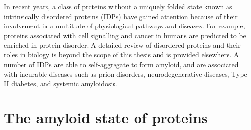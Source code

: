 In recent years, a class of proteins without a uniquely folded state known as intrinsically disordered proteins (IDPs) have gained attention because of their involvement in a multitude of physiological pathways and diseases.  For example, proteins associated with cell signalling and cancer in humans are predicted to be enriched in protein disorder.\cite{Dunker:2002ex}
A detailed review of disordered proteins and their roles in biology is beyond the scope of this thesis and is provided elsewhere.\cite{Rauscher:2010p5682,Uversky:2008gh} A number of IDPs are able to self-aggregate to form amyloid, and are associated with incurable diseases such as prion disorders, neurodegenerative diseases, Type II diabetes, and systemic amyloidosis. 




\section{The amyloid state of proteins}
\label{sec:amyloid}

